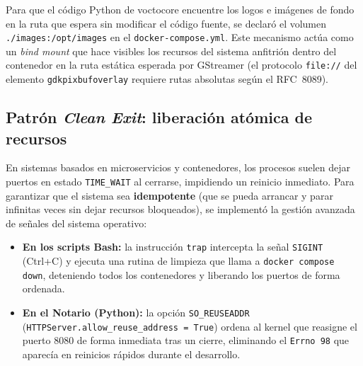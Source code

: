 Para que el código Python de voctocore encuentre los logos e imágenes de fondo en
la ruta que espera sin modificar el código fuente, se declaró el volumen
\texttt{./images:/opt/images} en el \texttt{docker-compose.yml}. Este mecanismo
actúa como un \textit{bind mount} que hace visibles los recursos del sistema
anfitrión dentro del contenedor en la ruta estática esperada por GStreamer
(el protocolo \texttt{file://} del elemento \texttt{gdkpixbufoverlay} requiere
rutas absolutas según el RFC~8089).


\subsection{Patrón \textit{Clean Exit}: liberación atómica de recursos}
\label{sec:clean_exit}

En sistemas basados en microservicios y contenedores, los procesos suelen dejar
puertos en estado \texttt{TIME\_WAIT} al cerrarse, impidiendo un reinicio inmediato.
Para garantizar que el sistema sea \textbf{idempotente} (que se pueda arrancar y
parar infinitas veces sin dejar recursos bloqueados), se implementó la gestión
avanzada de señales del sistema operativo:

\begin{itemize}
  \item \textbf{En los scripts Bash:} la instrucción \texttt{trap} intercepta la señal
        \texttt{SIGINT} (Ctrl+C) y ejecuta una rutina de limpieza que llama a
        \texttt{docker compose down}, deteniendo todos los contenedores y liberando
        los puertos de forma ordenada.
  \item \textbf{En el Notario (Python):} la opción \texttt{SO\_REUSEADDR}
        (\texttt{HTTPServer.allow\_reuse\_address = True}) ordena al kernel que
        reasigne el puerto 8080 de forma inmediata tras un cierre, eliminando el
        \texttt{Errno~98} que aparecía en reinicios rápidos durante el desarrollo.
\end{itemize}
